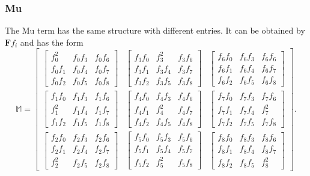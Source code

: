\subsubsection{Mu}
The Mu term has the same structure with different entries. It can be obtained by $\mathbf{F} f_i$ and has the form
\[
\mathbb{M} = \left[\begin{array}{ccc}{\begin{bmatrix} f_0^2 & f_0f_3 & f_0f_6 \\ f_0f_1 & f_0f_4 & f_0f_7 \\ f_0f_2 & f_0f_5 & f_0f_8 \end{bmatrix}} & {\begin{bmatrix} f_3f_0 & f_3^2 & f_3f_6 \\ f_3f_1 & f_3f_4 & f_3f_7 \\ f_3f_2 & f_3f_5 & f_3f_8 \end{bmatrix}} & {\begin{bmatrix} f_6f_0 & f_6f_3 & f_6f_6 \\ f_6f_1 & f_6f_4 & f_6f_7 \\ f_6f_2 & f_6f_5 & f_6f_8 \end{bmatrix}} \\ {\begin{bmatrix} f_1f_0 & f_1f_3 & f_1f_6 \\ f_1^2 & f_1f_4 & f_1f_7 \\ f_1f_2 & f_1f_5 & f_1f_8 \end{bmatrix}} & {\begin{bmatrix} f_4f_0 & f_4f_3 & f_4f_6 \\ f_4f_1 & f_4^2 & f_4f_7 \\ f_4f_2 & f_4f_5 & f_4f_8 \end{bmatrix}} & {\begin{bmatrix} f_7f_0 & f_7f_3 & f_7f_6 \\ f_7f_1 & f_7f_4 & f_7^2 \\ f_7f_2 & f_7f_5 & f_7f_8 \end{bmatrix}} \\ {\begin{bmatrix} f_2f_0 & f_2f_3 & f_2f_6 \\ f_2f_1 & f_2f_4 & f_2f_7 \\ f_2^2 & f_2f_5 & f_2f_8 \end{bmatrix}} & {\begin{bmatrix} f_5f_0 & f_5f_3 & f_5f_6 \\ f_5f_1 & f_5f_4 & f_5f_7 \\ f_5f_2 & f_5^2 & f_5f_8 \end{bmatrix}} & {\begin{bmatrix} f_8f_0 & f_8f_3 & f_8f_6 \\ f_8f_1 & f_8f_4 & f_8f_7 \\ f_8f_2 & f_8f_5 & f_8^2 \end{bmatrix}} \end{array}\right].
\]
